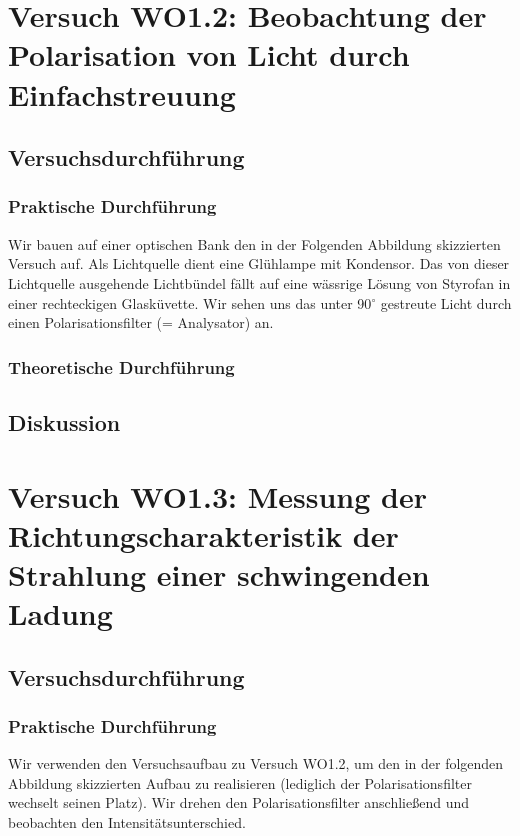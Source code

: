 \documentclass[12pt]{scrartcl}
\begin{document}
\section{Versuch WO1.2: Beobachtung der Polarisation von Licht durch Einfachstreuung}
\subsection{Versuchsdurchführung}
\subsubsection{Praktische Durchführung}
Wir bauen auf einer optischen Bank den in der Folgenden Abbildung skizzierten
Versuch auf.
Als Lichtquelle dient eine Glühlampe mit Kondensor. Das von dieser Lichtquelle ausgehende Lichtbündel fällt auf eine wässrige Lösung von Styrofan in einer rechteckigen Glasküvette.
Wir sehen uns das unter
90$^\circ$ gestreute Licht durch einen Polarisationsfilter (= Analysator) an. 
\subsubsection{Theoretische Durchführung}
\subsection{Diskussion}

\section{Versuch WO1.3:
Messung der Richtungscharakteristik der Strahlung einer schwingenden Ladung}
\subsection{Versuchsdurchführung}
\subsubsection{Praktische Durchführung}
Wir verwenden den Versuchsaufbau zu Versuch WO1.2, um den in der folgenden Abbildung skizzierten Aufbau zu realisieren (lediglich der Polarisationsfilter wechselt seinen Platz).
Wir drehen den Polarisationsfilter anschließend und beobachten den Intensitätsunterschied.
\end{document}
